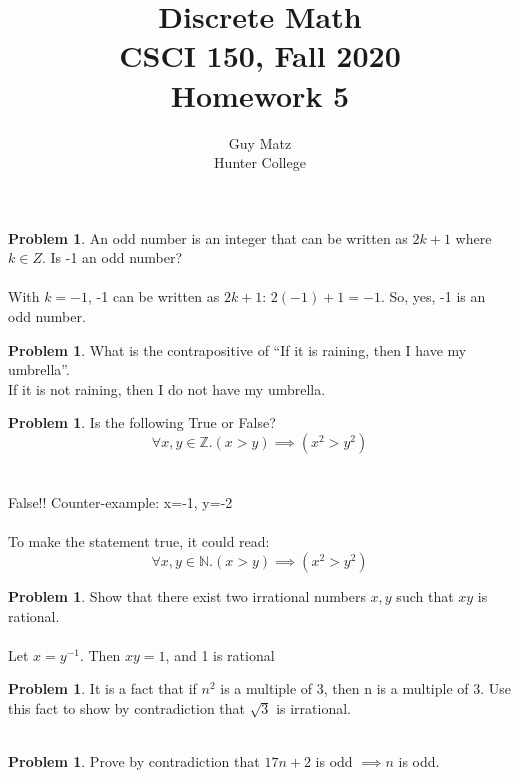 \documentclass[10pt,leqno ]{article}
\title{Discrete Math\\
CSCI 150, Fall 2020\\
Homework 5}
\author{Guy Matz \\
Hunter College}
\theoremstyle{definition}
\newtheorem{problem}[theorem]{Problem}
\begin{document}
\begin{problem} An odd number is an integer that can be written as $2k + 1$ where $k \in Z$.  Is -1 an odd number?
\\\\
\Large
With $k=-1$, -1 can be written as $2k + 1$: $2(-1) + 1 = -1$.  So, yes, -1 is an odd number.

\end{problem}
\newpage

\begin{problem} What is the contrapositive of “If it is raining, then I have my umbrella”.
\\
\Large
If it is not raining, then I do not have my umbrella.
\end{problem}
\newpage

\begin{problem} Is the following True or False?
$$ \forall x, y \in  \mathbb{Z}.(x > y) \implies (x^2 > y^2)$$
\\\\
\Large
False!!  Counter-example: x=-1, y=-2
\\\\
To make the statement true, it could read:
$$ \forall x, y \in  \mathbb{N}.(x > y) \implies (x^2 > y^2)$$
\end{problem}
\newpage

\begin{problem} Show that there exist two irrational numbers $x, y$ such that $xy$ is rational.
\\\\
\Large
Let $x = y^{-1}$.  Then $xy = 1$, and 1 is rational
\end{problem}
\newpage

\begin{problem} It is a  fact that if $n^2$ is a multiple of 3, then n is
a multiple of 3. Use this fact to show by contradiction that $\sqrt{3}$  is irrational.
\\\\
\Large

\end{problem}
\newpage

\begin{problem} Prove by contradiction that $17n + 2$ is odd $\implies n$ is odd.
\\\\
\Large

\end{problem}
\newpage
\end{document}
